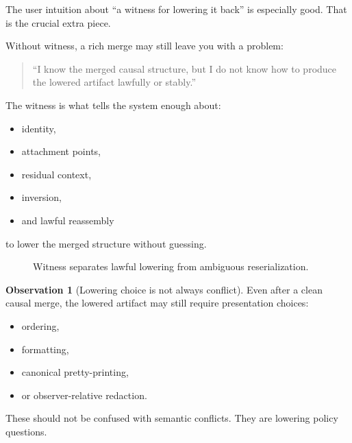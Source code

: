 \documentclass[11pt]{article}
\newcommand{\Lower}{\ensuremath{\mathsf{Lower}}}
\theoremstyle{definition}
\newtheorem{observation}{Observation}
\begin{document}
The user intuition about ``a witness for lowering it back'' is especially good.
That is the crucial extra piece.

Without witness, a rich merge may still leave you with a problem:
\begin{quote}
``I know the merged causal structure, but I do not know how to produce the
lowered artifact lawfully or stably.''
\end{quote}

The witness is what tells the system enough about:
\begin{itemize}[leftmargin=2em]
\item identity,
\item attachment points,
\item residual context,
\item inversion,
\item and lawful reassembly
\end{itemize}
to lower the merged structure without guessing.

\begin{figure}[h]
\centering
{}
\caption{Witness separates lawful lowering from ambiguous reserialization.}
\end{figure}

\begin{observation}[Lowering choice is not always conflict]
Even after a clean causal merge, the lowered artifact may still require
presentation choices:
\begin{itemize}[leftmargin=2em]
\item ordering,
\item formatting,
\item canonical pretty-printing,
\item or observer-relative redaction.
\end{itemize}

These should not be confused with semantic conflicts. They are lowering policy
questions.
\end{observation}
\end{document}
